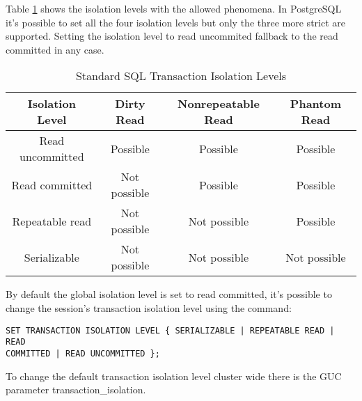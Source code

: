 Table \ref{tab:TRNISOLATION} shows the isolation levels with the 
allowed phenomena. In PostgreSQL it's possible to set all the four 
isolation levels but only the three more strict are supported. Setting the 
isolation level to read uncommited fallback to the read committed in any case.

\begin{table}[H]
  \begin{tabular}{cccc}
    Isolation Level & Dirty Read    &    Nonrepeatable Read   &   Phantom 
Read\\ 
    \hline
    Read uncommitted  &  Possible    &    Possible     &   Possible\\
    Read committed    &  Not possible &  Possible     &   Possible\\
    Repeatable read   &  Not possible  & Not possible  &  Possible\\
    Serializable      &  Not possible  & Not possible   & Not possible\\
  \end{tabular}
  \caption{\label{tab:TRNISOLATION}Standard SQL Transaction Isolation Levels}
\end{table}

By default the global isolation level is set to read committed, it's possible 
to change the session's transaction isolation level using the command:
\begin{verbatim}
SET TRANSACTION ISOLATION LEVEL { SERIALIZABLE | REPEATABLE READ | READ 
COMMITTED | READ UNCOMMITTED }; 
\end{verbatim}

To change the default transaction isolation level cluster wide there is the GUC 
parameter transaction\_isolation.





